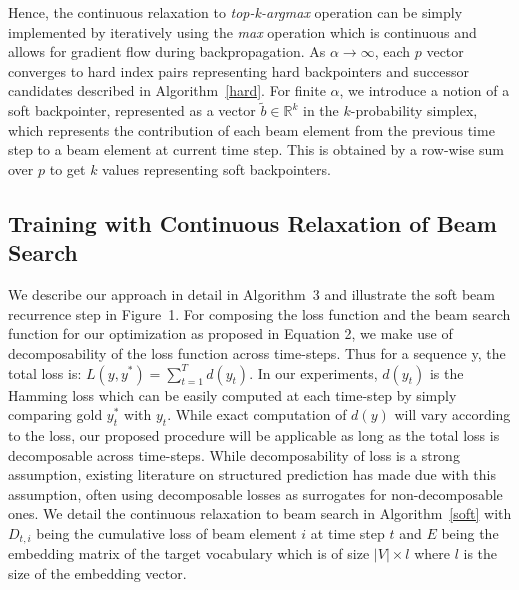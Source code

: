 \documentclass[letterpaper]{article} %
\begin{document}
Hence, the continuous relaxation to \textit{top-k-argmax} operation can be simply implemented by iteratively using the \textit{max} operation which is continuous and allows for gradient flow during backpropagation. As $\alpha \to \infty$, each $p$ vector converges to hard index pairs representing hard backpointers and successor candidates described in Algorithm~\ref{hard}. For finite $\alpha$, we introduce a notion of a soft backpointer, represented as a vector $\tilde{b} \in \mathbb{R}^k$ in the $k$-probability simplex, which represents the contribution of each beam element from the previous time step to a beam element at current time step. This is obtained by a row-wise sum over $p$ to get $k$ values representing soft backpointers. 

\subsection{Training with Continuous Relaxation of Beam Search \label{sec-soft-beam}}
We describe our approach in detail in Algorithm~3 and illustrate the soft beam recurrence step in Figure~1. For composing the loss function and the beam search function for our optimization as proposed in Equation 2, we make use of decomposability of the loss function across time-steps. Thus for a sequence y, the total loss is: $L(y,y^*) = \sum_{t=1}^T d(y_t)$. In our experiments, $d(y_t)$ is the Hamming loss which can be easily computed at each time-step by simply comparing gold $y_t^*$ with $y_t$. While exact computation of $d(y)$ will vary according to the loss, our proposed procedure will be applicable as long as the total loss is decomposable across time-steps. While decomposability of loss is a strong assumption, existing literature on structured prediction \cite{taskar2004max,tsochantaridis2005large} has made due with this assumption, often using decomposable losses as surrogates for non-decomposable ones. We detail the continuous relaxation to beam search in Algorithm~\ref{soft} with $D_{t,i}$ being the cumulative loss of beam element $i$ at time step $t$ and $E$ being the embedding matrix of the target vocabulary which is of size $|V|\times l$ where $l$ is the size of the embedding vector.
\end{document}

